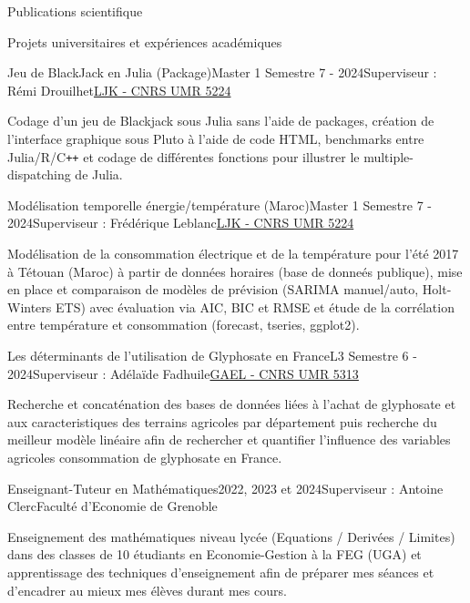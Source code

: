 \documentclass[11pt,]{resume}
\begin{document}
\begin{rSection}{Publications scientifique}
\begin{rSection}{Projets universitaires et expériences académiques}
	\begin{rSubsection}{Jeu de BlackJack en Julia (Package)}{Master 1 Semestre 7 - 2024}{Superviseur : Rémi Drouilhet}{\href{https://www-ljk.imag.fr/}{LJK - CNRS UMR 5224}}
		\item Codage d'un jeu de Blackjack sous Julia sans l'aide de packages, création de l'interface graphique sous Pluto à l'aide de code HTML, benchmarks entre Julia/R/C\texttt{++} et codage de différentes fonctions pour illustrer le multiple-dispatching de Julia.
	\end{rSubsection}

	\begin{rSubsection}{Modélisation temporelle énergie/température (Maroc)}{Master 1 Semestre 7 - 2024}{Superviseur : Frédérique Leblanc}{\href{https://www-ljk.imag.fr/}{LJK - CNRS UMR 5224}}
		\item Modélisation de la consommation électrique et de la température pour l'été 2017 à Tétouan (Maroc) à partir de données horaires (base de donneés publique), mise en place et comparaison de modèles de prévision (SARIMA manuel/auto, Holt-Winters ETS) avec évaluation via AIC, BIC et RMSE et étude de la corrélation entre température et consommation (forecast, tseries, ggplot2).
	\end{rSubsection}

	\begin{rSubsection}{Les déterminants de l'utilisation de Glyphosate en France}{L3 Semestre 6 - 2024}{Superviseur : Adélaïde Fadhuile}{\href{https://gael.univ-grenoble-alpes.fr/fr}{GAEL - CNRS UMR 5313}}
		\item Recherche et concaténation des bases de données liées à l'achat de glyphosate et aux caracteristiques des terrains agricoles par département puis recherche du meilleur modèle linéaire afin de rechercher et quantifier l'influence des variables agricoles consommation de glyphosate en France.
	\end{rSubsection}

	\begin{rSubsection}{Enseignant-Tuteur en Mathématiques}{2022, 2023 et 2024}{Superviseur : Antoine Clerc}{Faculté d'Economie de Grenoble}
		\item Enseignement des mathématiques niveau lycée (Equations / Derivées / Limites) dans des classes de 10 étudiants en Economie-Gestion à la FEG (UGA) et apprentissage des techniques d'enseignement afin de préparer mes séances et d'encadrer au mieux mes élèves durant mes cours.
	\end{rSubsection}


\end{rSection}
\end{rSection}
\end{document}
